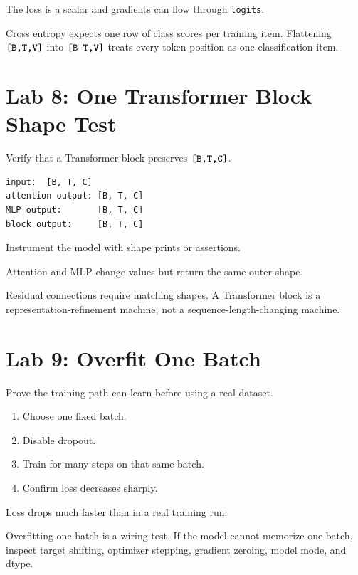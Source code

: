  The loss is a scalar and gradients can flow through \texttt{logits}.

 Cross entropy expects one row of class scores per training item. Flattening \(\texttt{[B,T,V]}\) into \(\texttt{[B T,V]}\) treats every token position as one classification item.

\section{Lab 8: One Transformer Block Shape Test}

 Verify that a Transformer block preserves \(\texttt{[B,T,C]}\).


\begin{lstlisting}
input:  [B, T, C]
attention output: [B, T, C]
MLP output:       [B, T, C]
block output:     [B, T, C]
\end{lstlisting}

Instrument the model with shape prints or assertions.

 Attention and MLP change values but return the same outer shape.

 Residual connections require matching shapes. A Transformer block is a representation-refinement machine, not a sequence-length-changing machine.

\section{Lab 9: Overfit One Batch}

 Prove the training path can learn before using a real dataset.


\begin{enumerate}
  \item Choose one fixed batch.
  \item Disable dropout.
  \item Train for many steps on that same batch.
  \item Confirm loss decreases sharply.
\end{enumerate}

 Loss drops much faster than in a real training run.

 Overfitting one batch is a wiring test. If the model cannot memorize one batch, inspect target shifting, optimizer stepping, gradient zeroing, model mode, and dtype.


